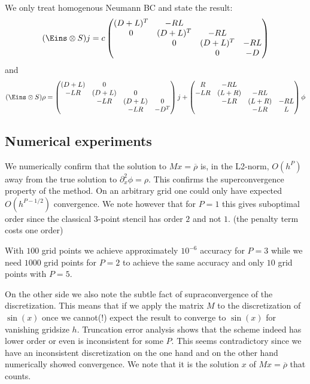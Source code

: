 \documentclass[a4paper,12pt]{scrartcl}
\begin{document}
We only treat homogenous Neumann BC and state the result:
\begin{align}
    (\Eins\otimes S) j = c
    \begin{pmatrix}
        (D+L)^T & -RL & &  \\
          0 & (D + L)^T & -RL & \\
            &0& (D + L)^T & -RL \\
            & &0& -D  
    \end{pmatrix}
    \label{}
\end{align}
and 
\begin{align}
    (\Eins\otimes S) \rho =
    \begin{pmatrix}
        (D+L) &0 & &\\
        -LR & (D+L) &0 & \\
            & -LR & (D+L) &0\\
            & & -LR & -D^T
    \end{pmatrix}j+
    \begin{pmatrix}
        R & -RL & &\\
        -LR & (L+R) & -RL&\\
            & -LR & (L+R) & -RL\\
            & & -LR & L
    \end{pmatrix}\phi
    \label{}
\end{align}
\subsection{Numerical experiments}
We numerically confirm that the solution to $Mx=\overline \rho$ is, in the 
L2-norm, $O(h^P)$ away from the true solution to $\partial_x^2 \phi = \rho$.
This confirms the superconvergence property of the method. On an arbitrary grid
one could only have expected $O(h^{P-1/2})$ convergence.
We note however that for $P=1$ this gives suboptimal order since the classical 
$3$-point stencil has order $2$ and not $1$. (the penalty term costs one order)

With $100$ grid points we achieve approximately $10^{-6}$ accuracy for $P=3$ 
while we
need $1000$ grid points for $P=2$ to achieve the same accuracy and only 
$10$ grid points with $P=5$.

On the other side we also note the subtle fact of supraconvergence 
of the discretization. 
This means that if we apply the matrix $M$ to the discretization of $\sin(x)$ once
we cannot(!) expect the result to converge to $\sin(x)$ for vanishing gridsize $h$. 
Truncation error analysis shows that the scheme indeed has lower order or even is 
inconsistent for some $P$. This seems contradictory since we have an inconsistent
discretization on the one hand and on the other hand numerically showed 
convergence. We note that it is the solution $x$ of $Mx=\overline\rho$ that counts.  
\end{document}
